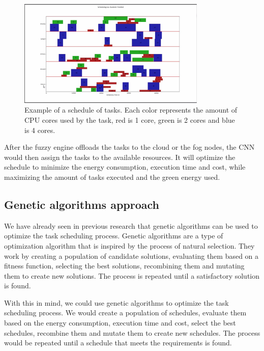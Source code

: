 \begin{figure}[H]
  \centering
  \includegraphics[width=0.8\textwidth]{../images/schedule.jpg}
  \caption{Example of a schedule of tasks. Each color represents the amount of CPU cores used by the task, red is 1 core,
    green is 2 cores and blue is 4 cores.}
  \label{fig:schedule}
\end{figure}

After the fuzzy engine offloads the tasks to the cloud or the fog nodes, the CNN would then assign the tasks to the
available resources. It will optimize the schedule to minimize the energy consumption, execution time and cost, while
maximizing the amount of tasks executed and the green energy used.

\subsection{Genetic algorithms approach}
\label{subsec:ga-approach}

We have already seen in previous research that genetic algorithms can be used to optimize the task scheduling process.
Genetic algorithms are a type of optimization algorithm that is inspired by the process of natural selection. They work
by creating a population of candidate solutions, evaluating them based on a fitness function, selecting the best solutions,
recombining them and mutating them to create new solutions. The process is repeated until a satisfactory solution is found.

With this in mind, we could use genetic algorithms to optimize the task scheduling process. We would create a population
of schedules, evaluate them based on the energy consumption, execution time and cost, select the best schedules, recombine
them and mutate them to create new schedules. The process would be repeated until a schedule that meets the requirements
is found.
